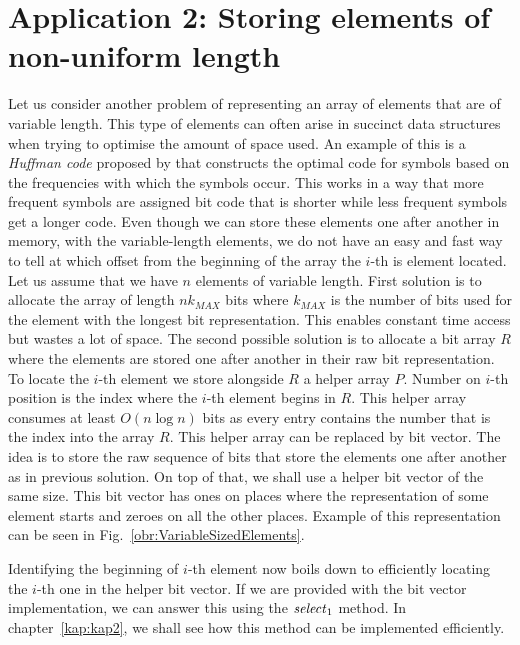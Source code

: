 \section{Application 2: Storing elements of non-uniform length}

Let us consider another problem of representing an array of elements that are of variable length.
This type of elements can often arise in succinct data structures when trying to
optimise the amount of space used. An example of this is a \textit{Huffman code}
proposed by \cite{huffman1952method} that constructs the optimal code for symbols based
on the frequencies with which the symbols occur. This works in a way that more frequent
symbols are assigned bit code that is shorter while less frequent symbols get a longer code.
Even though we can store these elements one after another in memory, with the variable-length
elements, we do not have an easy and fast way to tell at which offset from the beginning of the
array the $i$-th is element located. Let us assume that we have $n$ elements of variable length.
First solution is to allocate the array of length $nk_{MAX}$ bits where $k_{MAX}$ is the number
of bits used for the element with the longest bit representation. This enables constant time access
but wastes a lot of space. The second possible solution is to allocate a bit array $R$ where
the elements are stored one after another in their raw bit representation. To locate the $i$-th element
we store alongside $R$ a helper array $P$. Number on $i$-th position is the index where the $i$-th
element begins in $R$. This helper array consumes at least $O(n\log n)$ bits as every entry
contains the number that is the index into the array $R$. This helper array can be replaced by bit vector.
The idea is to store the raw sequence of bits that store the elements one after another as in previous
solution. On top of that, we shall use a helper bit vector of the same size. This bit vector has ones on
places where the representation of some element starts and zeroes on all the other places. Example
of this representation can be seen in Fig.~\ref{obr:VariableSizedElements}.

Identifying the beginning of $i$-th element now boils down to efficiently locating the
$i$-th one in the helper bit vector. If we are provided with the bit vector implementation,
we can answer this using the $\mathit{select}_1$ method. In chapter~\ref{kap:kap2}, we shall see how
this method can be implemented efficiently.


